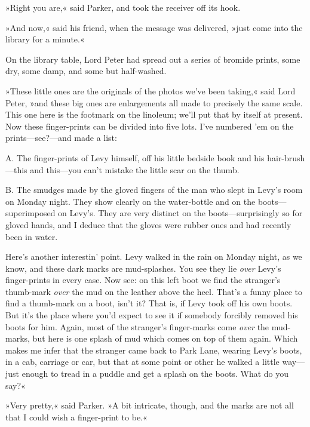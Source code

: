 »Right you are,« said Parker, and took the receiver off its hook.

»And now,« said his friend, when the message was delivered, »just come into the library for a minute.«

On the library table, Lord Peter had spread out a series of bromide prints, some dry, some damp, and some but half-washed.

»These little ones are the originals of the photos we've been taking,« said Lord Peter, »and these big ones are enlargements all made to precisely the same scale. This one here is the footmark on the linoleum; we'll put that by itself at present. Now these finger-prints can be divided into five lots. I've numbered 'em on the prints\allowbreak---\allowbreak see?---and made a list:

\textsc{A.} The finger-prints of Levy himself, off his little bedside book and his hair-brush\allowbreak---\allowbreak this and this\allowbreak---\allowbreak you can't mistake the little scar on the thumb.

\textsc{B.} The smudges made by the gloved fingers of the man who slept in Levy's room on Monday night. They show clearly on the water-bottle and on the boots\allowbreak---\allowbreak superimposed on Levy's. They are very distinct on the boots\allowbreak---\allowbreak surprisingly so for gloved hands, and I deduce that the gloves were rubber ones and had recently been in water.

Here's another interestin' point. Levy walked in the rain on Monday night, as we know, and these dark marks are mud-splashes. You see they lie \textit{over} Levy's finger-prints in every case. Now see: on this left boot we find the stranger's thumb-mark \textit{over} the mud on the leather above the heel. That's a funny place to find a thumb-mark on a boot, isn't it? That is, if Levy took off his own boots. But it's the place where you'd expect to see it if somebody forcibly removed his boots for him. Again, most of the stranger's finger-marks come \textit{over} the mud-marks, but here is one splash of mud which comes on top of them again. Which makes me infer that the stranger came back to Park Lane, wearing Levy's boots, in a cab, carriage or car, but that at some point or other he walked a little way\allowbreak---\allowbreak just enough to tread in a puddle and get a splash on the boots. What do you say?«

»Very pretty,« said Parker. »A bit intricate, though, and the marks are not all that I could wish a finger-print to be.«

